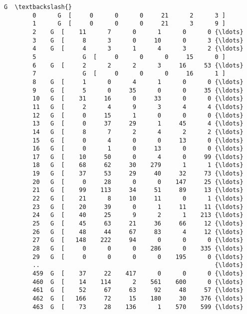 \documentclass[11pt]{article}
\begin{document}
\begin{Verbatim}[commandchars=\\\{\}]
                                                             G  \textbackslash{}
        0      G  [     0      0      0     21      2      3 ]   
        1      G  [     0      0      0     21      3      9 ]   
        2    G  [    11      7      0      1      0      0 {\ldots}   
        3    G  [     8      3      0     10      0      3 {\ldots}   
        4    G  [     4      3      1      4      3      2 {\ldots}   
        5             G  [     0      0      0     15      0 ]   
        6    G  [     2      2      2      3     16     53 {\ldots}   
        7             G  [     0      0      0     16      1 ]   
        8    G  [     1      0      4      1      0      0 {\ldots}   
        9    G  [     5      0     35      0      0     35 {\ldots}   
        10   G  [    31     16      0     33      0      0 {\ldots}   
        11   G  [     2      4      9      3      4      4 {\ldots}   
        12   G  [     0     15      1      0      0      0 {\ldots}   
        13   G  [     0     37     29      1     45      4 {\ldots}   
        14   G  [     8      7      2      4      2      2 {\ldots}   
        15   G  [     0      4      0      0     13      0 {\ldots}   
        16   G  [     0      1      0     13      0      0 {\ldots}   
        17   G  [    10     50      0      4      0     99 {\ldots}   
        18   G  [    68     62     30    279      1      1 {\ldots}   
        19   G  [    37     53     29     40     32     73 {\ldots}   
        20   G  [     0     28      0      0    147     25 {\ldots}   
        21   G  [    99    113     34     51     89     13 {\ldots}   
        22   G  [    21      8     10     11      0      1 {\ldots}   
        23   G  [    20     39      0      1     11     11 {\ldots}   
        24   G  [    40     25      9      2      1    213 {\ldots}   
        25   G  [    45     63     21     36     66     12 {\ldots}   
        26   G  [    48     44     67     83      4     12 {\ldots}   
        27   G  [   148    222     94      0      0      0 {\ldots}   
        28   G  [     0      0      0    286      0    335 {\ldots}   
        29   G  [     0      0      0      0    195      0 {\ldots}   
        ..                                                 {\ldots}   
        459  G  [    37     22    417      0      0      0 {\ldots}   
        460  G  [    14    114      2    561    600      0 {\ldots}   
        461  G  [    52     67     63     92     48     57 {\ldots}   
        462  G  [   166     72     15    180     30    376 {\ldots}   
        463  G  [    73     28    136      1    570    599 {\ldots}   

\end{Verbatim}
\end{document}
